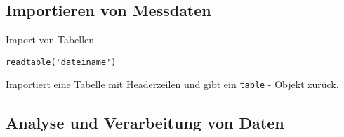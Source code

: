         \subsection{Importieren von Messdaten}
        \begin{CodeErklaerungBox}{Import von Tabellen}
            \begin{lstlisting}
readtable('dateiname')
            \end{lstlisting}
            \tcblower
            Importiert eine Tabelle mit Headerzeilen und gibt ein \texttt{table} - Objekt zurück.
        \end{CodeErklaerungBox}
        \subsection{Analyse und Verarbeitung von Daten}
        